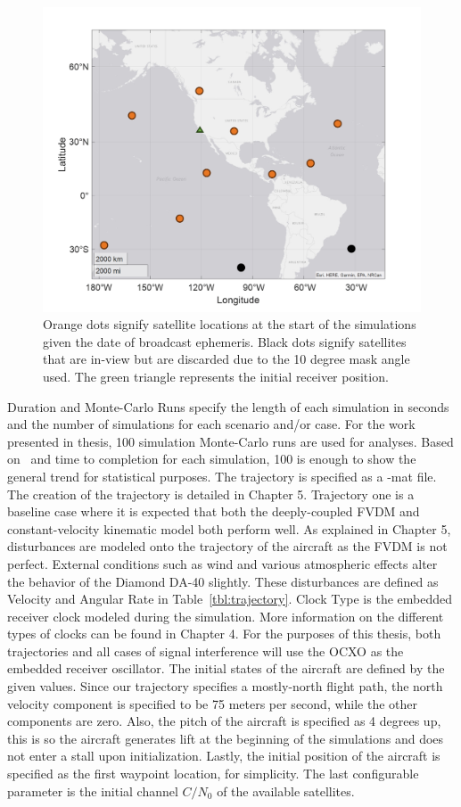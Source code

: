 \begin{figure}[!ht]
    \centering
    \includegraphics[width=0.8\linewidth]{Figures/Results/skyplot.png}
    \caption{Orange dots signify satellite locations at the start of the simulations given the date of broadcast ephemeris. Black dots signify satellites that are in-view but are discarded due to the 10 degree mask angle used. The green triangle represents the initial receiver position.}\label{fig:skyplot}
\end{figure}
Duration and Monte-Carlo Runs specify the length of each simulation in seconds and the number of simulations for each scenario and/or case. For the work presented in thesis, 100 simulation Monte-Carlo runs are used for analyses. Based on~\cite{khaghaniAssessmentVDMbasedAutonomous2018,khaghaniAutonomousVehicleDynamic2016,mwenegohaModelbasedTightlyCoupled2020} and time to completion for each simulation, 100 is enough to show the general trend for statistical purposes. The trajectory is specified as a -mat file. The creation of the trajectory is detailed in Chapter 5. Trajectory one is a baseline case where it is expected that both the deeply-coupled FVDM and constant-velocity kinematic model both perform well.  As explained in Chapter 5, disturbances are modeled onto the trajectory of the aircraft as the FVDM is not perfect. External conditions such as wind and various atmospheric effects alter the behavior of the Diamond DA-40 slightly. These disturbances are defined as Velocity and Angular Rate in Table~\ref{tbl:trajectory}. Clock Type is the embedded receiver clock modeled during the simulation. More information on the different types of clocks can be found in Chapter 4. For the purposes of this thesis, both trajectories and all cases of signal interference will use the OCXO as the embedded receiver oscillator. The initial states of the aircraft are defined by the given values. Since our trajectory specifies a mostly-north flight path, the north velocity component is specified to be 75 meters per second, while the other components are zero. Also, the pitch of the aircraft is specified as 4 degrees up, this is so the aircraft generates lift at the beginning of the simulations and does not enter a stall upon initialization. Lastly, the initial position of the aircraft is specified as the first waypoint location, for simplicity. The last configurable parameter is the initial channel \(C/N_0\) of the available satellites.


